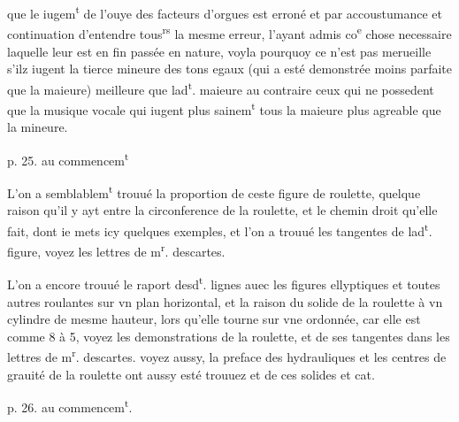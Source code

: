 \documentclass[11pt,a4paper]{article}
\begin{document}


que le iugem\textsuperscript{t} de l'ouye des facteurs d'orgues est erroné et  par accoustumance et continuation d'entendre tous\textsuperscript{rs} la mesme erreur, l'ayant admis co\textsuperscript{e} chose necessaire laquelle leur est en fin passée en nature, voyla pourquoy ce n'est pas merueille s'ilz iugent la tierce mineure des tons egaux (qui a esté demonstrée moins parfaite que la maieure) meilleure que lad\textsuperscript{t}. maieure au contraire ceux qui ne possedent que la musique vocale qui iugent plus sainem\textsuperscript{t}  tous la maieure plus agreable que la mineure.

p. 25. au commencem\textsuperscript{t}

L'on a semblablem\textsuperscript{t} trouué la proportion de ceste figure de roulette, quelque raison qu'il y ayt entre la circonference de la roulette, et le chemin droit qu'elle fait, dont ie mets icy quelques exemples, et l'on a trouué les tangentes de lad\textsuperscript{t}. figure, voyez les lettres de m\textsuperscript{r}. descartes.

L'on a encore trouué le raport desd\textsuperscript{t}. lignes auec les figures ellyptiques et toutes autres roulantes sur vn plan horizontal, et la raison du solide de la roulette à vn cylindre de mesme hauteur, lors qu'elle tourne sur vne ordonnée, car elle est comme 8 à 5, voyez les demonstrations de la roulette, et de ses tangentes dans les lettres de m\textsuperscript{r}. descartes. voyez aussy, la preface des hydrauliques et les centres de grauité de la roulette ont aussy esté trouuez et de ces solides et cat.

p. 26. au commencem\textsuperscript{t}.
\end{document}
